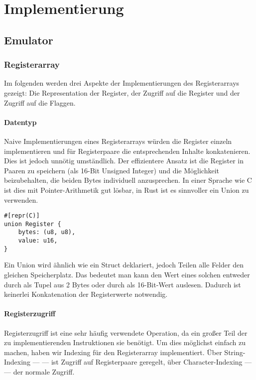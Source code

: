 \chapter{Implementierung}\label{chap:impl}

\section{Emulator}

\subsection{Registerarray}

Im folgenden werden drei Aspekte der Implementierungen des Registerarrays gezeigt: Die Representation der Register, der Zugriff auf die Register und der Zugriff auf die Flaggen.

\subsubsection{Datentyp}

Naive Implementierungen eines Registerarrays würden die Register einzeln implementieren und für Registerpaare die entsprechenden Inhalte konkatenieren.
Dies ist jedoch unnötig umständlich. Der effizientere Ansatz ist die Register in Paaren zu speichern (als 16-Bit Unsigned Integer) und die Möglichkeit beizubehalten, die beiden Bytes individuell anzusprechen. In einer Sprache wie C ist dies mit Pointer-Arithmetik gut lösbar, in Rust ist es sinnvoller ein Union zu verwenden.

\begin{verbatim}
#[repr(C)]
union Register {
    bytes: (u8, u8),
    value: u16,
}
\end{verbatim}

Ein Union wird ähnlich wie ein Struct deklariert, jedoch Teilen alle Felder den gleichen Speicherplatz. Das bedeutet man kann den Wert eines solchen  entweder durch  als Tupel aus 2 Bytes oder durch  als 16-Bit-Wert auslesen. Dadurch ist keinerlei Konkatenation der Registerwerte notwendig.

\subsubsection{Registerzugriff}

Registerzugriff ist eine sehr häufig verwendete Operation, da ein großer Teil der zu implementierenden Instruktionen sie benötigt. Um dies möglichst einfach zu machen, haben wir Indexing für den Registerarray implementiert. Über String-Indexing ---  --- ist Zugriff auf Registerpaare geregelt, über Character-Indexing ---  --- der normale Zugriff.

